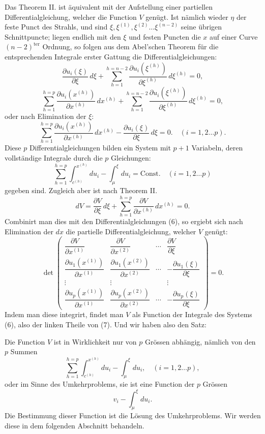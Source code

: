 \documentclass[10pt]{article}
\begin{document}
Das Theorem II. ist äquivalent mit der Aufstellung einer partiellen Differentialgleichung, welcher die Function \(V\) genügt. Ist nämlich wieder \(\eta\) der feste Punct des Strahls, und sind \(\xi,\xi^{(1)},\xi^{(2)}\ldots\xi^{(n-2)}\) seine übrigen Schnittpuncte; liegen endlich mit den \(\xi\) und festen Puncten die \(x\) auf einer Curve \((n-2)^{\mathrm{ter}}\) Ordnung, so folgen aus dem Abel'schen Theorem für die entsprechenden Integrale erster Gattung die Differentialgleichungen:
\[
\frac{\partial u_i(\xi)}{\partial\xi}\,d\xi+
\sum_{h=1}^{h=n-2}\frac{\partial u_i(\xi^{(h)})}{\partial\xi^{(h)}}\,d\xi^{(h)}=0,
\]
\[
\sum_{h=1}^{h=p}\frac{\partial u_i(x^{(h)})}{\partial x^{(h)}}\,dx^{(h)}+
\sum_{h=1}^{h=n-2}\frac{\partial u_i(\xi^{(h)})}{\partial\xi^{(h)}}\,d\xi^{(h)}=0,
\]
oder nach Elimination der \(\xi\):
\[
\tag{6}\sum_{h=1}^{h=p}\frac{\partial u_i(x^{(h)})}{\partial x^{(h)}}\,dx^{(h)}-\frac{\partial u_i(\xi)}{\partial\xi}\,d\xi=0.
\quad (i=1,2\ldots p).
\]
Diese \(p\) Differentialgleichungen bilden ein System mit \(p+1\) Variabeln, deren vollständige Integrale durch die \(p\) Gleichungen:
\[
\tag{7}\sum_{h=1}^{h=p}\int_{c^{(h)}}^{x^{(h)}}du_i-\int_{\mu}^{\xi}du_i=\mathrm{Const.}
\quad (i=1,2\ldots p)
\]
gegeben sind. Zugleich aber ist nach Theorem II.
\[
dV=\frac{\partial V}{\partial\xi}\,d\xi+
\sum_{h=1}^{h=p}\frac{\partial V}{\partial x^{(h)}}\,dx^{(h)}=0.
\]
Combinirt man dies mit den Differentialgleichungen (6), so ergiebt sich nach Elimination der \(dx\) die partielle Differentialgleichung, welcher \(V\) genügt:
\[
\det\begin{pmatrix}
\dfrac{\partial V}{\partial x^{(1)}} & \dfrac{\partial V}{\partial x^{(2)}} & \cdots & \dfrac{\partial V}{\partial\xi}\\[0.7em]
\dfrac{\partial u_1(x^{(1)})}{\partial x^{(1)}} & \dfrac{\partial u_1(x^{(2)})}{\partial x^{(2)}} & \cdots & -\dfrac{\partial u_1(\xi)}{\partial\xi}\\
\vdots & \vdots & & \vdots\\
\dfrac{\partial u_p(x^{(1)})}{\partial x^{(1)}} & \dfrac{\partial u_p(x^{(2)})}{\partial x^{(2)}} & \cdots & -\dfrac{\partial u_p(\xi)}{\partial\xi}
\end{pmatrix}=0.
\]
Indem man diese integrirt, findet man \(V\) als Function der Integrale des Systems (6), also der linken Theile von (7). Und wir haben also den Satz:

Die Function \(V\) ist in Wirklichkeit nur von \(p\) Grössen abhängig, nämlich von den \(p\) Summen
\[
\sum_{h=1}^{h=p}\int_{c^{(h)}}^{x^{(h)}}du_i-\int_{\mu}^{\xi}du_i,
\quad (i=1,2\ldots p),
\]
oder im Sinne des Umkehrproblems, sie ist eine Function der \(p\) Grössen
\[
v_i-\int_{\mu}^{\xi}du_i.
\]
Die Bestimmung dieser Function ist die Lösung des Umkehrproblems. Wir werden diese in dem folgenden Abschnitt behandeln.
\end{document}
